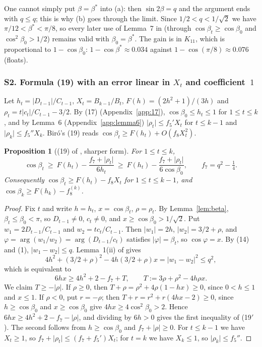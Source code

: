 \documentclass[11pt]{amsart}
\newtheorem{proposition}[theorem]{Proposition}
\theoremstyle{remark}
\theoremstyle{plain}
\newcommand{\abs}[1]{\lvert #1\rvert}
\begin{document}
One cannot simply put $\beta=\beta^*$ into (a): then $\sin2\beta=q$ and the argument ends with $q\le q$; this is why (b) goes through the limit. Since $1/2<q<1/\sqrt2$ we have $\pi/12<\beta^*<\pi/8$, so every later use of Lemma~7 in \cite{Bir00b} (through $\cos\beta_t\ge\cos\beta_0$ and $\cos^2\beta_0>1/2$) remains valid with $\beta_0=\beta^*$. The gain is in $K_{11}$, which is proportional to $1-\cos\beta_0$: $1-\cos\beta^*\approx0.034$ against $1-\cos(\pi/8)\approx0.076$ (floats).

\subsubsection*{S2. Formula (19) with an error linear in $X_t$ and coefficient~$1$}
Let $h_t=\abs{D_{t-1}}/C_{t-1}$, $X_t=B_{k-1}/B_t$, $F(h)=(2h^2+1)/(3h)$ and $\rho_t=t\abs{c_t}/C_{t-1}-3/2$. By (17) (Appendix~\ref{app:17}), $\cos\beta_0\le h_t\le1$ for $1\le t\le k$, and by Lemma~6 (Appendix~\ref{app:lemma6}) $\abs{\rho_t}\le f_5'X_t$ for $t\le k-1$ and $\abs{\rho_k}\le f_5''X_k$. Bir\'o's (19) reads $\cos\beta_t\ge F(h_t)+O(f_8X_t^2)$.

\begin{proposition}[(19) of \cite{Bir00b}, sharper form]\label{prop:19}
For $1\le t\le k$,
\begin{equation}\tag{19$'$}
  \cos\beta_t\ \ge\ F(h_t)-\frac{f_7+\abs{\rho_t}}{6h_t}\ \ge\ F(h_t)-\frac{f_7+\abs{\rho_t}}{6\cos\beta_0},\qquad f_7=q^2-\tfrac14 .
\end{equation}
Consequently $\cos\beta_t\ge F(h_t)-f_8X_t$ for $1\le t\le k-1$, and $\cos\beta_k\ge F(h_k)-f_8^{(k)}$.
\end{proposition}

\begin{proof}
Fix $t$ and write $h=h_t$, $x=\cos\beta_t$, $\rho=\rho_t$. By Lemma~\ref{lem:beta}, $\beta_t\le\beta_0<\pi$, so $D_{t-1}\ne0$, $c_t\ne0$, and $x\ge\cos\beta_0>1/\sqrt2$. Put $w_1=2D_{t-1}/C_{t-1}$ and $w_2=tc_t/C_{t-1}$. Then $\abs{w_1}=2h$, $\abs{w_2}=3/2+\rho$, and $\varphi=\arg(w_1/w_2)=\arg(D_{t-1}/c_t)$ satisfies $\abs\varphi=\beta_t$, so $\cos\varphi=x$. By (14) and (1), $\abs{w_1-w_2}\le q$. Lemma~1(ii) of \cite{Bir00b} gives
\[
4h^2+(3/2+\rho)^2-4h(3/2+\rho)x=\abs{w_1-w_2}^2\le q^2,
\]
which is equivalent to
\[
6hx\ge4h^2+2-f_7+T,\qquad T:=3\rho+\rho^2-4h\rho x .
\]
We claim $T\ge-\abs\rho$. If $\rho\ge0$, then $T+\rho=\rho^2+4\rho(1-hx)\ge0$, since $0<h\le1$ and $x\le1$. If $\rho<0$, put $r=-\rho$; then $T+r=r^2+r(4hx-2)\ge0$, since $h\ge\cos\beta_0$ and $x\ge\cos\beta_0$ give $4hx\ge4\cos^2\beta_0>2$. Hence $6hx\ge4h^2+2-f_7-\abs\rho$, and dividing by $6h>0$ gives the first inequality of (19$'$). The second follows from $h\ge\cos\beta_0$ and $f_7+\abs\rho\ge0$. For $t\le k-1$ we have $X_t\ge1$, so $f_7+\abs{\rho_t}\le(f_7+f_5')X_t$; for $t=k$ we have $X_k\le1$, so $\abs{\rho_k}\le f_5''$.
\end{proof}
\end{document}

